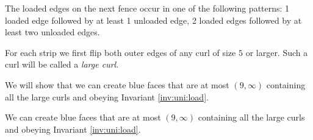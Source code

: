 \begin{invariants}
  \label{inv:uni:load}
  \item The loaded edges on the next fence occur in one of the following patterns: 1 loaded edge followed by at least 1 unloaded edge, 2 loaded edges followed by at least two unloaded edges.
\end{invariants}

For each strip we first flip both outer edges of any curl of size $5$ or larger. Such a curl will be called a \emph{large curl}.

We will show that we can create blue faces that are at most $(9, \infty)$ containing all the large curls and obeying Invariant \ref{inv:uni:load}.

\begin{lemma}
  \label{lm:uni:removingLargeCurls}
  We can create blue faces that are at most $(9, \infty)$ containing all the large curls and obeying Invariant \ref{inv:uni:load}.
\end{lemma}


